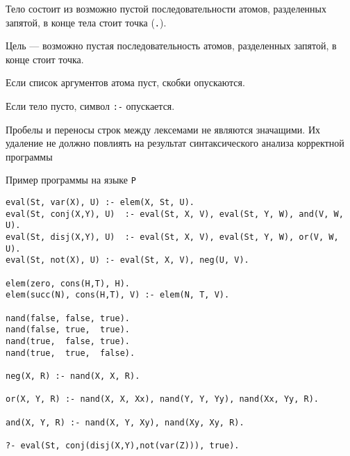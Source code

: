 \documentclass[12pt]{article}
\begin{document}
Тело состоит из возможно пустой последовательности атомов, разделенных запятой, в конце тела стоит точка (\verb!.!).

Цель --- возможно пустая последовательность атомов, разделенных запятой, в конце стоит точка. 

Если список аргументов атома пуст, скобки опускаются. 

Если тело пусто, символ \verb!:-! опускается. 

Пробелы и переносы строк между лексемами не являются значащими. Их удаление не должно повлиять на результат синтаксического анализа корректной программы
\newpage
\begin{center}
    \Large{Пример программы на языке \verb!P!}
\end{center}

\begin{verbatim}
eval(St, var(X), U) :- elem(X, St, U).
eval(St, conj(X,Y), U)  :- eval(St, X, V), eval(St, Y, W), and(V, W, U).
eval(St, disj(X,Y), U)  :- eval(St, X, V), eval(St, Y, W), or(V, W, U).
eval(St, not(X), U) :- eval(St, X, V), neg(U, V).

elem(zero, cons(H,T), H).
elem(succ(N), cons(H,T), V) :- elem(N, T, V).

nand(false, false, true).
nand(false, true,  true).
nand(true,  false, true).
nand(true,  true,  false).

neg(X, R) :- nand(X, X, R).

or(X, Y, R) :- nand(X, X, Xx), nand(Y, Y, Yy), nand(Xx, Yy, R).

and(X, Y, R) :- nand(X, Y, Xy), nand(Xy, Xy, R).

?- eval(St, conj(disj(X,Y),not(var(Z))), true).
\end{verbatim}
\end{document}
